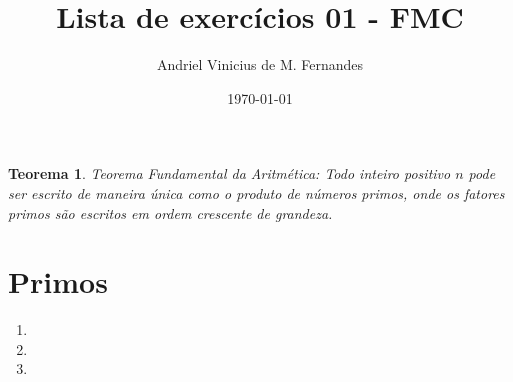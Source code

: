 \documentclass[12pt]{article}
\title{Lista de exercícios 01 - FMC}
\author{Andriel Vinicius de M. Fernandes}
\date{\today}
\newtheorem{theorem}{Teorema}
\begin{document}
\maketitle
\begin{theorem}
	Teorema Fundamental da Aritmética:
	Todo inteiro positivo $n$ pode ser escrito de maneira única como o produto de números primos, onde os fatores primos são escritos em ordem crescente de grandeza.
\end{theorem}
\section{Primos}
\begin{enumerate}
	\item 
	\item 
	\item 
\end{enumerate}
\end{document}
